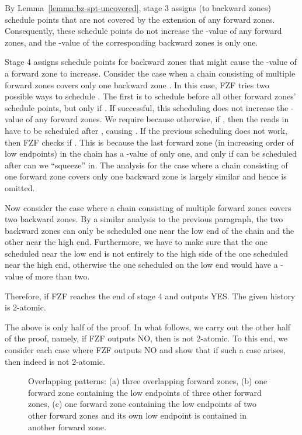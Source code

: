 {By Lemma~\ref{lemma:bz-spt-uncovered}, stage 3 assigns (to backward zones)
schedule points that are not covered by the extension of any forward zones.
Consequently, these schedule points do not increase the -value
of any forward zones, and the -value of the corresponding backward zones is only one.

Stage 4 assigns schedule points for backward zones that might cause
the -value of a forward zone to increase.  Consider the case
when a chain consisting of multiple forward zones covers only one
backward zone .  In this case, FZF tries two possible ways to
schedule .  The first is to schedule  before all other
forward zones' schedule points, but only if .  If
successful, this scheduling does not increase the -value of
any forward zones.  We require  because otherwise, if
, then the reads in  have to be scheduled after
, causing .  If the previous scheduling does not
work, then FZF checks if .  This is because the last
forward zone (in increasing order of low endpoints) in the chain has a
-value of only one, and only if  can be scheduled after
 can we ``squeeze''  in.  The analysis for the case where a
chain consisting of one forward zone covers only one backward zone is
largely similar and hence is omitted.

Now consider the case where a chain consisting of multiple forward
zones covers two backward zones.  By a similar analysis to the
previous paragraph, the two backward zones can only be scheduled one
near the low end of the chain and the other near the high end.
Furthermore, we have to make sure that the one scheduled near the low
end is not entirely to the high side of the one scheduled near the
high end, otherwise the one scheduled on the low end would have a
-value of more than two.

Therefore, if FZF reaches the end of stage 4 and outputs YES.  The
given history is 2-atomic.  \QED

The above is only half of the proof.  In what follows, we carry out
the other half of the proof, namely, if FZF outputs NO, then  is
not 2-atomic.  To this end, we consider each case where FZF outputs NO
and show that if such a case arises, then indeed  is not 2-atomic.

\begin{figure}[tbp]
  \caption{Overlapping patterns: (a) three overlapping forward zones,
    (b) one forward zone containing the low endpoints of three other
    forward zones, (c) one forward zone containing the low endpoints
    of two other forward zones and its own low endpoint is contained
    in another forward zone.}
  \label{fig:overlap}
\end{figure}

}
